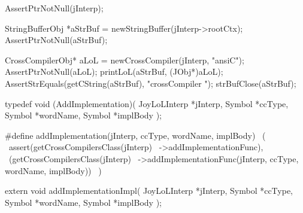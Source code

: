 \startCTest
  AssertPtrNotNull(jInterp);

  StringBufferObj *aStrBuf = newStringBuffer(jInterp->rootCtx);
  AssertPtrNotNull(aStrBuf);

  CrossCompilerObj* aLoL =
    newCrossCompiler(jInterp, "ansiC");
  AssertPtrNotNull(aLoL);
  printLoL(aStrBuf, (JObj*)aLoL);
  AssertStrEquals(getCString(aStrBuf), "crossCompiler ");
  strBufClose(aStrBuf);
\stopCTest
\stopTestCase

\stopTestSuite

\startTestSuite[addImplementation]

\startCHeader
typedef void (AddImplementation)(
  JoyLoLInterp *jInterp,
  Symbol       *ccType,
  Symbol       *wordName,
  Symbol       *implBody
);

#define addImplementation(jInterp, ccType, wordName, implBody)      \
  (                                                                 \
    assert(getCrossCompilersClass(jInterp)                          \
      ->addImplementationFunc),                                     \
    (getCrossCompilersClass(jInterp)                                \
      ->addImplementationFunc(jInterp, ccType, wordName, implBody)) \
  )
\stopCHeader

\setCHeaderStream{private}
\startCHeader
extern void addImplementationImpl(
  JoyLoLInterp *jInterp,
  Symbol       *ccType,
  Symbol       *wordName,
  Symbol       *implBody
);
\stopCHeader
\setCHeaderStream{public}

